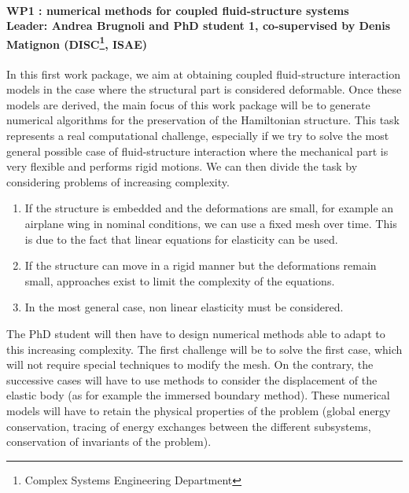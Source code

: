 \documentclass[12pt]{article}
\begin{document}
	\paragraph[\large WP1 : numerical methods for coupled fluid-structure systems\\
	Leader: Andrea Brugnoli and PhD student 1, co-supervised by Denis Matignon (DISC, ISAE)\\]{\large WP1 : numerical methods for coupled fluid-structure systems\\
		Leader: Andrea Brugnoli and PhD student 1, co-supervised by Denis Matignon (DISC\footnote{Complex Systems Engineering Department}, ISAE)\\}
		In this first work package, we aim at obtaining coupled fluid-structure interaction models in the case where the structural part is considered deformable. Once these models are derived, the main focus of this work package will be to generate numerical algorithms for the preservation of the Hamiltonian structure. This task represents a real computational challenge, especially if we try to solve the most general possible case of fluid-structure interaction where the mechanical part is very flexible and performs rigid motions. We can then divide the task by considering problems of increasing complexity. 
		\begin{enumerate}
			\item If the structure is embedded and the deformations are small, for example an airplane wing in nominal conditions, we can use a fixed mesh over time. This is due to the fact that linear equations for elasticity can be used. 
			\item If the structure can move in a rigid manner but the deformations remain small, approaches exist to limit the complexity of the equations.
			\item In the most general case, non linear elasticity must be considered. 
		\end{enumerate}
		The PhD student will then have to design numerical methods able to adapt to this increasing complexity. The first challenge will be to solve the first case, which will not require special techniques to modify the mesh. On the contrary, the successive cases will have to use methods to consider the displacement of the elastic body (as for example the immersed boundary method). These numerical models will have to retain the physical properties of the problem (global energy conservation, tracing of energy exchanges between the different subsystems, conservation of invariants of the problem).
		
\end{document}
